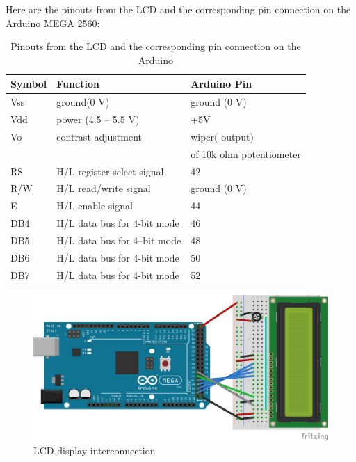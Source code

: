 Here are the pinouts from the LCD and the corresponding pin connection on the Arduino MEGA 2560:
\begin{table}[H]
	\centering
	\caption{Pinouts from the LCD and the corresponding pin connection on the Arduino}	
	\label{tab:LCD_connectto_Arduino}
	\begin{tabularx}{0.65\textwidth}{lll}
		\toprule
		\textbf{Symbol} & \textbf{Function} & \textbf{Arduino Pin} 	\\
		\midrule
		Vss & ground(0 V) & ground (0 V) 							\\
		\midrule
		Vdd & power (4.5 – 5.5 V) & +5V 							\\
		\midrule
		Vo & contrast adjustment & wiper( output) 					\\
		& & of 10k ohm potentiometer 								\\
		\midrule
		RS & H/L register select signal & 42 						\\
		\midrule
		R/W	& H/L read/write signal & ground (0 V) 					\\
		\midrule
		E & H/L enable signal	& 44 								\\
		\midrule
		DB4	& H/L data bus for 4-bit mode & 46 						\\
		\midrule
		DB5	& H/L data bus for 4--bit mode & 48 					\\
		\midrule
		DB6	& H/L data bus for 4-bit mode & 50 						\\
		\midrule
		DB7	& H/L data bus for 4-bit mode & 52 						\\
		\bottomrule
	\end{tabularx}
\end{table}

\begin{figure}[H]
	\centering
	\includegraphics[width=\maxwidth{15cm}, keepaspectratio]{Chapters/Fig/deltarobot_LCD_16x2.png}
	\caption{LCD display interconnection}
	\label{fig:deltarobot_LCD_16x2}
\end{figure}

